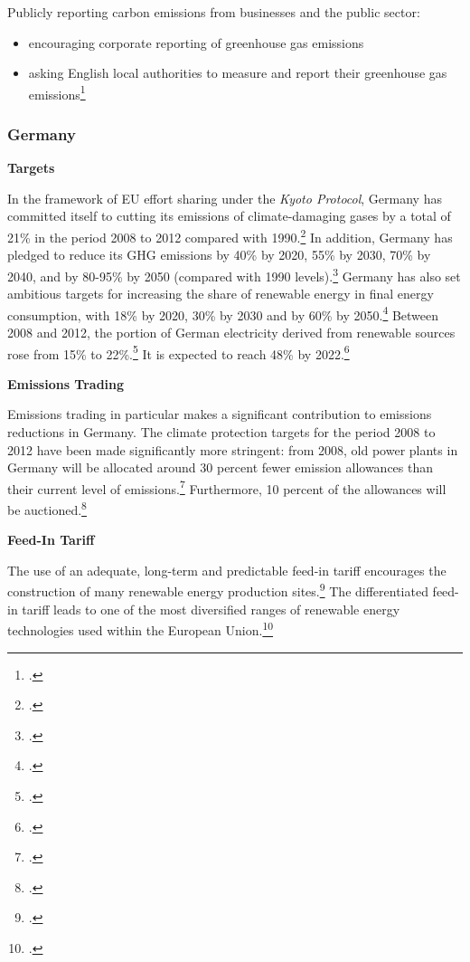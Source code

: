 Publicly reporting carbon emissions from businesses and the public sector:
\begin{itemize}
	\item encouraging corporate reporting of greenhouse gas emissions
	\item asking English local authorities to measure and report their greenhouse gas emissions\footcite[][]{UKgovnt}
\end{itemize}



	\subsubsection{Germany}
	
	

\textbf{Targets}



In the framework of EU effort sharing under the \emph{Kyoto Protocol}, Germany has committed itself to cutting its emissions of climate-damaging gases by a total of 21\% in the period 2008 to 2012 compared with 1990.\footcite[][]{KyotoTargetsGermany}
In addition, Germany has pledged to reduce its GHG emissions by 40\% by 2020, 55\% by 2030, 70\% by 2040, and by 80-95\% by 2050 (compared with 1990 levels).\footcite[][]{GermanyGHG}
Germany has also set ambitious targets for increasing the share of renewable energy in final energy consumption, with 18\% by 2020, 30\% by 2030 and by 60\% by 2050.\footcite[][]{GermanyGHG}
Between 2008 and 2012, the portion of German electricity derived from renewable sources rose from 15\% to 22\%.\footcite[][p. 12]{EconWindmills}
It is expected to reach 48\% by 2022.\footcite[][]{EconWindmills}



\textbf{Emissions Trading}



Emissions trading in particular makes a significant contribution to emissions reductions in Germany. 
The climate protection targets for the period 2008 to 2012 have been made significantly more stringent: from 2008, old power plants in Germany will be allocated around 30 percent fewer emission allowances than their current level of emissions.\footcite[][]{BMUprogramme}
Furthermore, 10 percent of the allowances will be auctioned.\footcite[][]{GermanyTrading}



\textbf{Feed-In Tariff}



The use of an adequate, long-term and predictable feed-in tariff encourages the construction of many renewable energy production sites.\footcite[][]{GermanyTariff}
The differentiated feed-in tariff leads to one of the most diversified ranges of renewable energy technologies used within the European Union.\footcite[][]{GermanyTariff}




